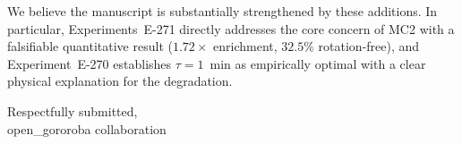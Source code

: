 \documentclass{article}
\begin{document}
\bigskip

\noindent We believe the manuscript is substantially strengthened by these
additions.  In particular, Experiments~E-271 directly addresses the core
concern of MC2 with a falsifiable quantitative result ($1.72\times$
enrichment, $32.5\%$ rotation-free), and Experiment~E-270 establishes
$\tau=1$~min as empirically optimal with a clear physical explanation for
the degradation.

\bigskip\noindent
Respectfully submitted,\\
open\_gororoba collaboration
\end{document}
